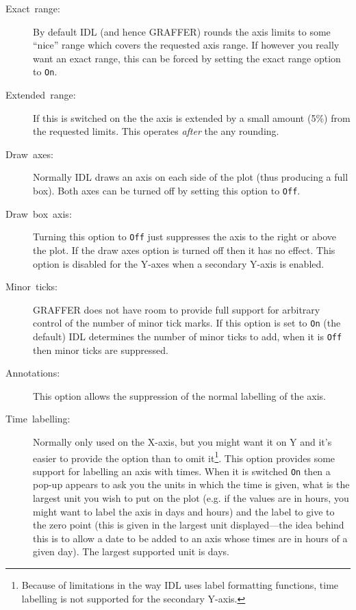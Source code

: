 \documentclass[11pt,twoside,english]{article}
\begin{document}
\begin{description}
  \begin{description}
  \item [Exact~range:]By default IDL (and hence GRAFFER) rounds the
    axis limits to some {}``nice'' range which covers the requested
    axis range. If however you really want an exact range, this can be
    forced by setting the exact range option to \texttt{On}.
  \item [Extended~range:]If this is switched on the the axis is
    extended by a small amount (5\%) from the requested limits. This
    operates \textit{after} the any rounding.
  \item [Draw~axes:]Normally IDL draws an axis on each side of the plot
    (thus producing a full box). Both axes can be turned off by setting
    this option to \texttt{Off}.
  \item [Draw~box~axis:]Turning this option to \texttt{Off} just
    suppresses the axis to the right or above the plot. If the draw
    axes option is turned off then it has no effect. This option is
    disabled for the Y-axes when a secondary Y-axis is enabled.
  \item [Minor~ticks:]GRAFFER does not have room to provide full
    support for arbitrary control of the number of minor tick marks. If
    this option is set to \texttt{On} (the default) IDL determines the
    number of minor ticks to add, when it is \texttt{Off} then minor
    ticks are suppressed.
  \item[Annotations:] This option allows the suppression of the normal
    labelling of the axis.
  \item [Time~labelling:]Normally only used on the X-axis, but you
    might want it on Y and it's easier to provide the option than to
    omit it\footnote{Because of limitations in the way IDL uses label
      formatting functions, time labelling is not supported for the
      secondary Y-axis.}.  This option provides some support for
    labelling an axis with times.  When it is switched \texttt{On} then
    a pop-up appears to ask you the units in which the time is given,
    what is the largest unit you wish to put on the plot (e.g. if the
    values are in hours, you might want to label the axis in days and
    hours) and the label to give to the zero point (this is given in
    the largest unit displayed---the idea behind this is to allow a
    date to be added to an axis whose times are in hours of a given
    day). The largest supported unit is days.


\end{description}
\end{description}
\end{document}
